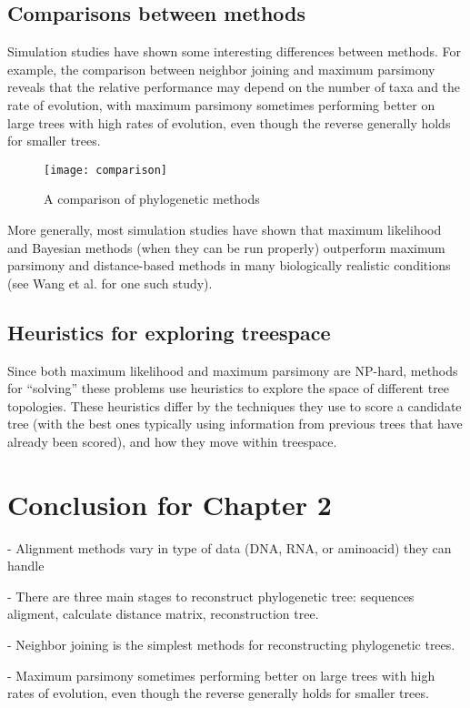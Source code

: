 \subsection{Comparisons between methods} \cite{hall}
Simulation studies have shown some interesting 
differences between methods. For example, the 
comparison between neighbor joining and maximum 
parsimony reveals that the relative performance may 
depend on the number of taxa and the rate of evolution, 
with maximum parsimony sometimes performing better 
on large trees with high rates of evolution, even 
though the reverse generally holds for smaller trees.  

\begin{figure}[t] 
  \center
  \texttt{[image: comparison]}
  \caption[w]{A comparison of phylogenetic methods \cite{comparison}} 
  \label{img:comparison}  
\end{figure}

More generally, most simulation studies have shown 
that maximum likelihood and Bayesian methods 
(when they can be run properly) outperform maximum 
parsimony and distance-based methods in many 
biologically realistic conditions 
(see Wang et al. for one such study). \cite{simmons}

\subsection{Heuristics for exploring treespace}
Since both maximum likelihood and maximum parsimony 
are NP-hard, methods for ``solving'' these problems 
use heuristics to explore the space of different tree 
topologies. These heuristics differ by the techniques 
they use to score a candidate tree (with the best 
ones typically using information from previous 
trees that have already been scored), and how 
they move within treespace. 
 

\section*{Conclusion for Chapter 2}

- Alignment methods vary in type of data \cite{rporter} (DNA, RNA, or aminoacid)
they can handle

- There are three main stages to reconstruct phylogenetic tree:
sequences aligment, calculate distance matrix, reconstruction tree.

- Neighbor joining is the simplest methods for reconstructing
phylogenetic trees.

- Maximum parsimony sometimes performing better 
on large trees with high rates of evolution, even 
though the reverse generally holds for smaller trees. 
 

\newpage